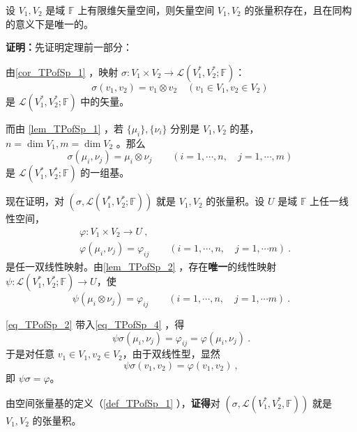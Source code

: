 \begin{theorem}{}\label{the_TPofSp_1}
设 $V_1,V_2$ 是域 $\mathbb F$ 上有限维矢量空间，则矢量空间 $V_1,V_2$ 的张量积存在，且在同构的意义下是唯一的。
\end{theorem}
\textbf{证明：}先证明定理前一部分：

由\autoref{cor_TPofSp_1} ，映射 $\sigma:V_1\times V_2\rightarrow\mathcal L(V^*_1,V^*_2;\mathbb F) $：
\begin{equation}\label{eq_TPofSp_7}
\sigma(v_1,v_2)=v_1\otimes v_2 \quad (v_1\in V_1,v_2\in V_2 )~
\end{equation}
是  $\mathcal L(V^*_1,V^*_2;\mathbb F)$ 中的矢量。

而由 \autoref{lem_TPofSp_1} ，若 $\{\mu_i\},\{\nu_i\}$ 分别是 $V_1,V_2$ 的基，$n=\dim V_1,m=\dim V_2$ 。那么
\begin{equation}\label{eq_TPofSp_2}
\sigma(\mu_i,\nu_j)=\mu_i\otimes \nu_j\qquad (i=1,\cdots,n,\quad j=1,\cdots,m)~
\end{equation}
是 $\mathcal L(V^*_1,V^*_2;\mathbb F)$ 的一组基。

现在证明，对 $(\sigma,\mathcal L(V^*_1,V^*_2;\mathbb F))$ 就是 $V_1,V_2$ 的张量积。设 $U$ 是域 $\mathbb F$ 上任一线性空间，
\begin{equation}\label{eq_TPofSp_3}
\begin{aligned}
&\varphi:V_1\times V_2\rightarrow U~,\\
&\varphi(\mu_i,\nu_j)=\varphi_{ij}\qquad (i=1,\cdots,n,\quad j=1,\cdots m)~.
\end{aligned}
\end{equation}
是任一双线性映射。由\autoref{lem_TPofSp_2} ，存在\textbf{唯一}的线性映射 $\psi:\mathcal L(V^*_1,V^*_2;\mathbb F)\rightarrow U$，使
\begin{equation}\label{eq_TPofSp_4}
\psi(\mu_i\otimes \nu_j)=\varphi_{ij}\qquad( i=1,\cdots,n,\quad j=1,\cdots m)~.
\end{equation}

\autoref{eq_TPofSp_2} 带入\autoref{eq_TPofSp_4}  ，得
\begin{equation}
\psi\sigma(\mu_i,\nu_j)=\varphi_{ij}=\varphi(\mu_i,\nu_j)~.
\end{equation}
于是对任意 $v_1\in V_1,v_2\in V_2$，由于双线性型，显然
\begin{equation}
\psi\sigma(v_1,v_2)=\varphi(v_1,v_2)~,
\end{equation}
即 $\psi\sigma=\varphi$。

由空间张量基的定义（\autoref{def_TPofSp_1} ），\textbf{证得}对 $(\sigma,\mathcal L(V^*_1,V^*_2,\mathbb F))$ 就是 $V_1,V_2$ 的张量积。

